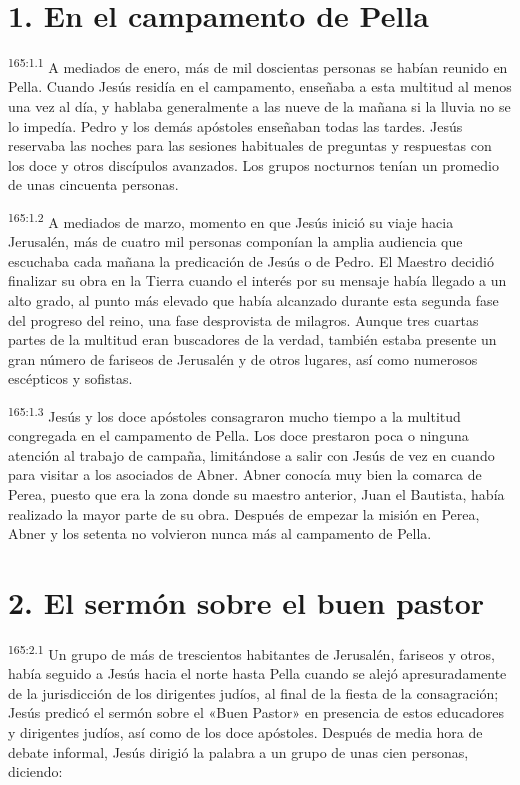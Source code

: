 \section*{1. En el campamento de Pella}
\par 
\textsuperscript{165:1.1} A mediados de enero, más de mil doscientas personas se habían reunido en Pella. Cuando Jesús residía en el campamento, enseñaba a esta multitud al menos una vez al día, y hablaba generalmente a las nueve de la mañana si la lluvia no se lo impedía. Pedro y los demás apóstoles enseñaban todas las tardes. Jesús reservaba las noches para las sesiones habituales de preguntas y respuestas con los doce y otros discípulos avanzados. Los grupos nocturnos tenían un promedio de unas cincuenta personas.

\par 
\textsuperscript{165:1.2} A mediados de marzo, momento en que Jesús inició su viaje hacia Jerusalén, más de cuatro mil personas componían la amplia audiencia que escuchaba cada mañana la predicación de Jesús o de Pedro. El Maestro decidió finalizar su obra en la Tierra cuando el interés por su mensaje había llegado a un alto grado, al punto más elevado que había alcanzado durante esta segunda fase del progreso del reino, una fase desprovista de milagros. Aunque tres cuartas partes de la multitud eran buscadores de la verdad, también estaba presente un gran número de fariseos de Jerusalén y de otros lugares, así como numerosos escépticos y sofistas.

\par 
\textsuperscript{165:1.3} Jesús y los doce apóstoles consagraron mucho tiempo a la multitud congregada en el campamento de Pella. Los doce prestaron poca o ninguna atención al trabajo de campaña, limitándose a salir con Jesús de vez en cuando para visitar a los asociados de Abner. Abner conocía muy bien la comarca de Perea, puesto que era la zona donde su maestro anterior, Juan el Bautista, había realizado la mayor parte de su obra. Después de empezar la misión en Perea, Abner y los setenta no volvieron nunca más al campamento de Pella.

\section*{2. El sermón sobre el buen pastor}
\par 
\textsuperscript{165:2.1} Un grupo de más de trescientos habitantes de Jerusalén, fariseos y otros, había seguido a Jesús hacia el norte hasta Pella cuando se alejó apresuradamente de la jurisdicción de los dirigentes judíos, al final de la fiesta de la consagración; Jesús predicó el sermón sobre el «Buen Pastor» en presencia de estos educadores y dirigentes judíos, así como de los doce apóstoles. Después de media hora de debate informal, Jesús dirigió la palabra a un grupo de unas cien personas, diciendo:


